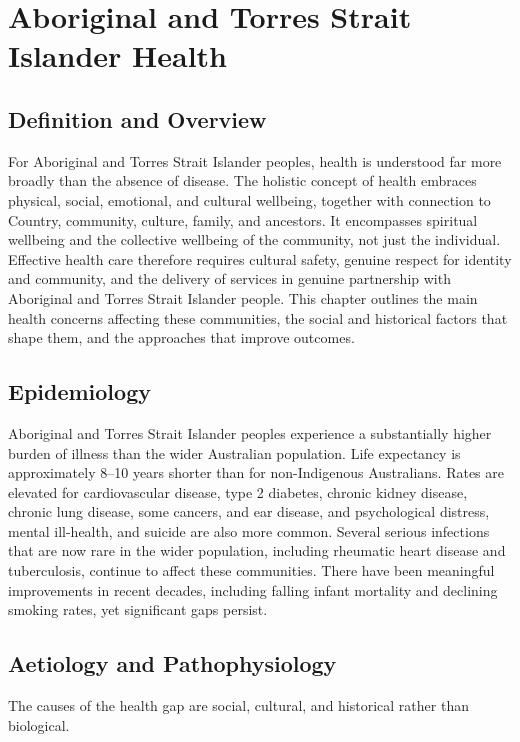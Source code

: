 \chapter{Aboriginal and Torres Strait Islander Health}

\section*{Definition and Overview}
For Aboriginal and Torres Strait Islander peoples, health is understood far more broadly than the absence of disease. The holistic concept of health embraces physical, social, emotional, and cultural wellbeing, together with connection to Country, community, culture, family, and ancestors. It encompasses spiritual wellbeing and the collective wellbeing of the community, not just the individual. Effective health care therefore requires cultural safety, genuine respect for identity and community, and the delivery of services in genuine partnership with Aboriginal and Torres Strait Islander people. This chapter outlines the main health concerns affecting these communities, the social and historical factors that shape them, and the approaches that improve outcomes.

\section*{Epidemiology}
Aboriginal and Torres Strait Islander peoples experience a substantially higher burden of illness than the wider Australian population. Life expectancy is approximately 8--10 years shorter than for non-Indigenous Australians. Rates are elevated for cardiovascular disease, type 2 diabetes, chronic kidney disease, chronic lung disease, some cancers, and ear disease, and psychological distress, mental ill-health, and suicide are also more common. Several serious infections that are now rare in the wider population, including rheumatic heart disease and tuberculosis, continue to affect these communities. There have been meaningful improvements in recent decades, including falling infant mortality and declining smoking rates, yet significant gaps persist.

\section*{Aetiology and Pathophysiology}
The causes of the health gap are social, cultural, and historical rather than biological.

